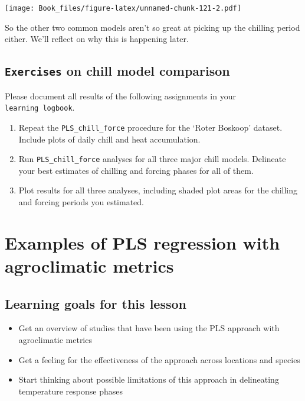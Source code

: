 \documentclass[
]{book}
\providecommand{\tightlist}{%
  \setlength{\itemsep}{0pt}\setlength{\parskip}{0pt}}
\begin{document}
\texttt{[image: Book\_files/figure-latex/unnamed-chunk-121-2.pdf]}

So the other two common models aren't so great at picking up the chilling period either. We'll reflect on why this is happening later.

\hypertarget{exercises_PLS_chill_force}{%
\section*{\texorpdfstring{\texttt{Exercises} on chill model comparison}{Exercises on chill model comparison}}\label{exercises_PLS_chill_force}}

Please document all results of the following assignments in your \texttt{learning\ logbook}.

\begin{enumerate}
\def\labelenumi{\arabic{enumi})}
\tightlist
\item
  Repeat the \texttt{PLS\_chill\_force} procedure for the `Roter Boskoop' dataset. Include plots of daily chill and heat accumulation.
\item
  Run \texttt{PLS\_chill\_force} analyses for all three major chill models. Delineate your best estimates of chilling and forcing phases for all of them.
\item
  Plot results for all three analyses, including shaded plot areas for the chilling and forcing periods you estimated.
\end{enumerate}

\hypertarget{pls_chillforce_ex}{%
\chapter{Examples of PLS regression with agroclimatic metrics}\label{pls_chillforce_ex}}

\hypertarget{goals_PLS_chillforce_ex}{%
\section*{Learning goals for this lesson}\label{goals_PLS_chillforce_ex}}

\begin{itemize}
\tightlist
\item
  Get an overview of studies that have been using the PLS approach with agroclimatic metrics
\item
  Get a feeling for the effectiveness of the approach across locations and species
\item
  Start thinking about possible limitations of this approach in delineating temperature response phases
\end{itemize}
\end{document}
